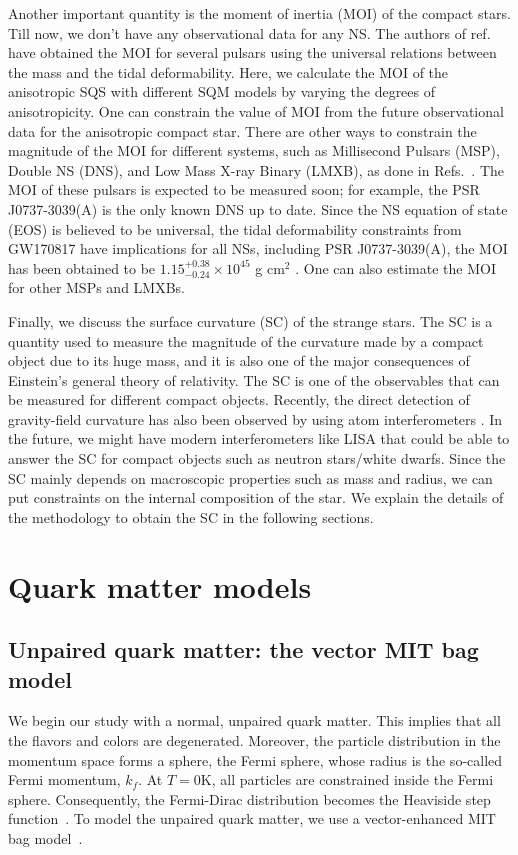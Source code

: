 \documentclass[%
reprint,
superscriptaddress,
nofootinbib,
amsmath,
amssymb,
aps,
floatfix,
showkeys,
]{revtex4-2}
\begin{document}
Another important quantity is the moment of inertia (MOI) of the compact stars. Till now, we don't have any observational data for any NS. The authors of ref.~\cite{Landry_2018} have obtained the MOI for several pulsars using the universal relations between the mass and the tidal deformability. Here, we calculate the MOI of the anisotropic SQS with different SQM models by varying the degrees of anisotropicity. One can constrain the value of MOI from the future observational data for the anisotropic compact star. There are other ways to constrain the magnitude of the MOI for different systems, such as Millisecond Pulsars (MSP), Double NS (DNS), and Low Mass X-ray Binary (LMXB), as done in Refs.~\cite{Landry_2018, Kumar_2019}. The MOI of these pulsars is expected to be measured soon; for example, the PSR J0737-3039(A) is the only known DNS up to date. Since the NS equation of state (EOS) is believed to be universal, the tidal deformability constraints from GW170817 have implications for all NSs, including PSR J0737-3039(A), the MOI has been obtained to be $1.15_{-0.24}^{+0.38}\times 10^{45}$ g cm$^2$ \cite{Landry_2018}. One can also estimate the MOI for other MSPs and LMXBs.

Finally, we discuss the surface curvature (SC) of the strange stars. The SC is a quantity used to measure the magnitude of the curvature made by a compact object due to its huge mass, and it is also one of the major consequences of Einstein's general theory of relativity. The SC is one of the observables that can be measured for different compact objects. Recently, the direct detection of gravity-field curvature has also been observed by using atom interferometers \cite{Rosi_2015}. In the future, we might have modern interferometers like LISA that could be able to answer the SC for compact objects such as neutron stars/white dwarfs. Since the SC mainly depends on macroscopic properties such as mass and radius, we can put constraints on the internal composition of the star. We explain the details of the methodology to obtain the SC in the following sections. 
\section{Quark matter models}
\subsection{Unpaired quark matter: the vector MIT bag model}
We begin our study with a normal, unpaired quark matter. This implies that all the flavors and colors are degenerated. Moreover, the particle distribution in the momentum space forms a sphere, the Fermi sphere, whose radius is the so-called Fermi momentum, $k_f$. At $T = 0$K, all particles are constrained inside the Fermi sphere. Consequently, the Fermi-Dirac distribution becomes the Heaviside step function~\cite{Greiner1995book}. To model the unpaired quark matter, we use a vector-enhanced MIT bag model~\cite{Klahn2015}.
\end{document}
